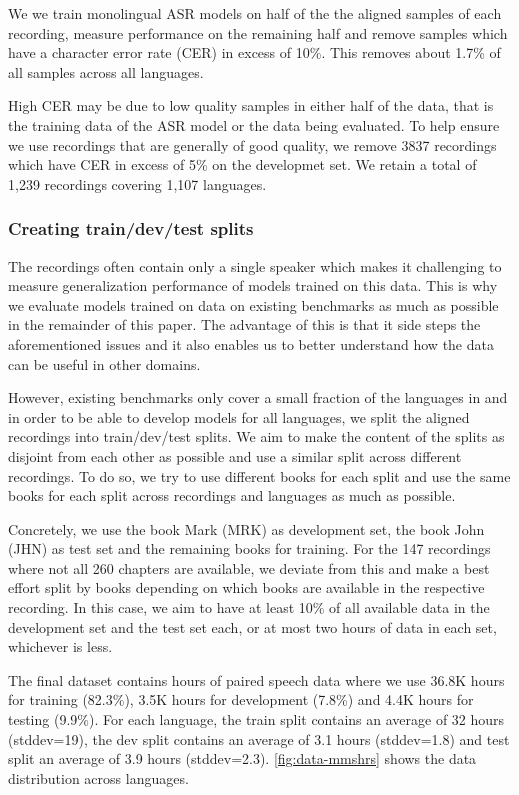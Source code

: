 We we train monolingual ASR models on half of the the aligned samples of each recording, measure performance on the remaining half and remove samples which have a character error rate (CER) in excess of 10\%. 
This removes about 1.7\% of all samples across all languages. 

High CER may be due to low quality samples in either half of the data, that is the training data of the ASR model or the data being evaluated. 
To help ensure we use recordings that are generally of good quality, we remove 3837 recordings which have CER in excess of 5\% on the developmet set.
We retain a total of 1,239 recordings covering 1,107 languages.

\subsubsection{Creating train/dev/test splits}
\label{sec:data-split}

\insertMMSHours

The recordings often contain only a single speaker which makes it challenging to measure generalization performance of models trained on this data.
This is why we evaluate models trained on \MMS{} data on existing benchmarks as much as possible in the remainder of this paper.
The advantage of this is that it side steps the aforementioned issues and it also enables us to better understand how the data can be useful in other domains.

However, existing benchmarks only cover a small fraction of the languages in \MMS{} and in order to be able to develop models for all languages, we split the aligned recordings into train/dev/test splits.
We aim to make the content of the splits as disjoint from each other as possible and use a similar split across different recordings.
To do so, we try to use different books for each split and use the same books for each split across recordings and languages as much as possible.

Concretely, we use the book Mark (MRK) as development set, the book John (JHN) as test set and the remaining books for training. 
For the 147 recordings where not all 260 chapters are available, we deviate from this and make a best effort split by books depending on which books are available in the respective recording.
In this case, we aim to have at least 10\% of all available data in the development set and the test set each, or at most two hours of data in each set, whichever is less.

The final dataset contains \nummmshrs{} hours of paired speech data where we use 36.8K hours for training (82.3\%), 3.5K hours for development (7.8\%) and 4.4K hours for testing (9.9\%).
For each language, the train split contains an average of 32 hours (stddev=19), the dev split contains an average of 3.1 hours (stddev=1.8) and test split an average of 3.9 hours (stddev=2.3).
\autoref{fig:data-mmshrs} shows the data distribution across languages.





